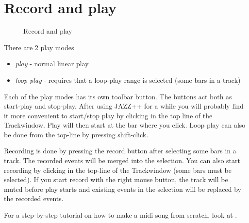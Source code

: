 \documentclass[letterpaper]{report}
\begin{document}
\section{Record and play}\label{recplay}

\begin{figure}
\caption{Record and play}
\end{figure}

There are 2 play modes
\begin{itemize}
\item {\em play} - normal linear play
\item {\em loop play} - requires that a loop-play range is selected (some bars in a track)
\end{itemize}

Each of the play modes has its own toolbar button. The buttons act both
as start-play and stop-play. After using JAZZ++ for a while you will
probably find it more convenient to start/stop play by clicking in the
top line of the Trackwindow. Play will then start at the bar where you click.
Loop play can also be done from the top-line by pressing shift-click.

Recording is done by pressing the record button after selecting
some bars in a track. The recorded events will be merged into the selection.
You can also start recording by clicking in the top-line of the Trackwindow
(some bars must be selected). If you start record with the right mouse button,
the track will be muted before play starts and existing events in the
selection will be replaced by the recorded events.

For a step-by-step tutorial on how to make a midi song from scratch, look at
.
\end{document}
